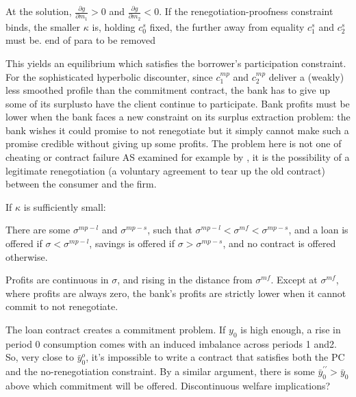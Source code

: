 \documentclass[11pt]{article}%
\newtheorem{proposition}{Proposition}
\providecommand{\DIFdel}[1]{{\protect\color{red} \scriptsize #1}} %
\providecommand{\DIFdelbegin}{} %
\begin{document}
\DIFdelbegin \DIFdel{At the solution, $\frac{\partial g}{\partial m_{1}}>0$ and $\frac{\partial g%
}{\partial m_{2}}<0$. If the renegotiation-proofness constraint binds, the
smaller $\kappa $ is, holding $c_{0}^{s}$ fixed, the further away from
equality $c_{1}^{s}$ and $c_{2}^{s}$ must be. }%
\DIFdel{end of para to be removed}%

\DIFdel{This yields an equilibrium which satisfies the borrower's participation
constraint. For the sophisticated hyperbolic discounter, since $c_{1}^{mp}$}%
\DIFdel{and $c_{2}^{mp}$}%
\DIFdel{deliver a (weakly) less smoothed profile than the
commitment contract, the bank has to give up some of its surplusto have the
client continue to participate. Bank profits must be lower when the bank faces a new constraint on its surplus extraction problem: the bank wishes it
could promise to not renegotiate but it simply cannot make such a promise
credible without giving up some profits. The problem here is not one of
cheating or contract failure }%
\DIFdel{AS examined for example by}%
\DIFdel{, it is the
possibility of a legitimate renegotiation (a voluntary agreement to tear up
the old contract) between the consumer and the firm.
}%

\DIFdel{If $\kappa $ is sufficiently small:
}%

\DIFdel{There are some $\sigma ^{mp-l}$ and $\sigma ^{mp-s}$, such that $%
\sigma ^{mp-l}<\sigma ^{mf}<\sigma ^{mp-s}$, and a loan is offered if $%
\sigma <\sigma ^{mp-l}$, savings is offered if $\sigma >\sigma ^{mp-s}$, and
no contract is offered otherwise.
}%

\DIFdel{Profits are continuous in
$\sigma $, and rising in the distance from $%
\sigma ^{mf}$. Except at $\sigma ^{mf}$, where profits are always zero, the
bank's profits are strictly lower when it cannot commit to not renegotiate.
}%

\DIFdel{The loan contract creates a commitment problem. If $y_{0}$ is high enough, a
rise in period 0 consumption comes with an induced imbalance across periods
1 and2. So, very close to $\bar{y}_{0}^{o}$, it's impossible to write a
contract that satisfies both the PC and the no-renegotiation constraint. By
a similar argument, there is some $\bar{y}_{0}^{\prime \prime }>\bar{y}_{0}$
above which commitment will be offered. }%
\DIFdel{Discontinuous welfare implications?}%
\end{document}
